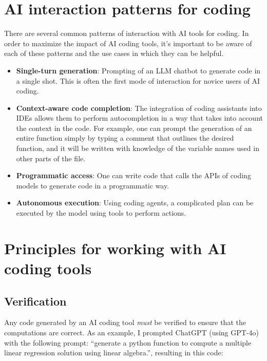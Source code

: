 \section{AI interaction patterns for coding}

There are several common patterns of interaction with AI tools for coding. In order to maximize the impact of AI coding tools, it's important to be aware of each of these patterns and the use cases in which they can be helpful.

\begin{itemize}
\item \textbf{Single-turn generation}:  Prompting of an LLM chatbot to generate code in a single shot.  This is often the first mode of interaction for novice users of AI coding.
\item \textbf{Context-aware code completion}: The integration of coding assistants into IDEs allows them to perform autocompletion in a way that takes into account the context in the code. For example, one can prompt the generation of an entire function simply by typing a comment that outlines the desired function, and it will be written with knowledge of the variable names used in other parts of the file.
\item \textbf{Programmatic access}: One can write code that calls the APIs of coding models to generate code in a programmatic way.
\item \textbf{Autonomous execution}: Using coding agents, a complicated plan can be executed by the model using tools to perform actions.
\end{itemize}

\section{Principles for working with AI coding tools}

\subsection{Verification}

Any code generated by an AI coding tool \textit{must} be verified to ensure that the computations are correct. As an example, I prompted ChatGPT (using GPT-4o) with the following prompt: ``generate a python function to compute a multiple linear regression solution using linear algebra.'', resulting in this code:

